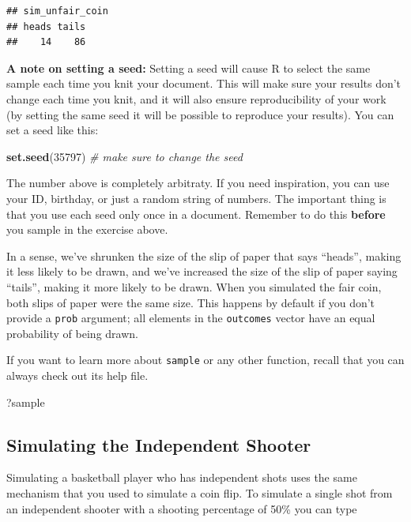 \documentclass[
]{article}
\newenvironment{Shaded}{\begin{snugshade}}{\end{snugshade}}
\newcommand{\CommentTok}[1]{\textcolor[rgb]{0.56,0.35,0.01}{\textit{#1}}}
\newcommand{\DecValTok}[1]{\textcolor[rgb]{0.00,0.00,0.81}{#1}}
\newcommand{\FunctionTok}[1]{\textcolor[rgb]{0.13,0.29,0.53}{\textbf{#1}}}
\newcommand{\NormalTok}[1]{#1}
\begin{document}
\begin{verbatim}
## sim_unfair_coin
## heads tails 
##    14    86
\end{verbatim}

\label{boxedtext}
\textbf{A note on setting a seed:} Setting a seed will cause R to select
the same sample each time you knit your document. This will make sure
your results don't change each time you knit, and it will also ensure
reproducibility of your work (by setting the same seed it will be
possible to reproduce your results). You can set a seed like this:

\begin{Shaded}
\begin{Highlighting}[]
\FunctionTok{set.seed}\NormalTok{(}\DecValTok{35797}\NormalTok{)                 }\CommentTok{\# make sure to change the seed}
\end{Highlighting}
\end{Shaded}

The number above is completely arbitraty. If you need inspiration, you
can use your ID, birthday, or just a random string of numbers. The
important thing is that you use each seed only once in a document.
Remember to do this \textbf{before} you sample in the exercise above.

In a sense, we've shrunken the size of the slip of paper that says
``heads'', making it less likely to be drawn, and we've increased the
size of the slip of paper saying ``tails'', making it more likely to be
drawn. When you simulated the fair coin, both slips of paper were the
same size. This happens by default if you don't provide a \texttt{prob}
argument; all elements in the \texttt{outcomes} vector have an equal
probability of being drawn.

If you want to learn more about \texttt{sample} or any other function,
recall that you can always check out its help file.

\begin{Shaded}
\begin{Highlighting}[]
\NormalTok{?sample}
\end{Highlighting}
\end{Shaded}

\subsection{Simulating the Independent
Shooter}\label{simulating-the-independent-shooter}

Simulating a basketball player who has independent shots uses the same
mechanism that you used to simulate a coin flip. To simulate a single
shot from an independent shooter with a shooting percentage of 50\% you
can type
\end{document}
